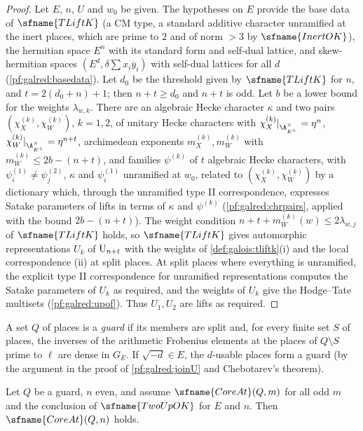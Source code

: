 \begin{proof}
Let $E$, $n$, $U$ and $w_0$ be given. The hypotheses on $E$ provide the base data of $\sfname{TLiftK}$ (a CM type, a standard
additive character unramified at the inert places, which are prime to $2$ and of norm $>3$ by $\sfname{InertOK}$), the
hermitian space $E^n$ with its standard form and self-dual lattice, and skew-hermitian spaces $(E^{d},\delta\sum x_i\bar y_i)$
with self-dual lattices for all $d$ (\cref{pf:galred:basedata}). Let $d_0$ be the threshold given by
$\sfname{TLiftK}$ for $n$, and $t=2(d_0+n)+1$; then $n+t\ge d_0$ and $n+t$ is odd. Let $b$ be a lower bound for the weights
$\lambda_{w,k}$. There are an algebraic Hecke character $\kappa$ and two pairs $(\chi_X^{(k)},\chi_W^{(k)})$, $k=1,2$, of unitary
Hecke characters with $\chi_X^{(k)}|_{\A_{E^+}^\times}=\eta^n$, $\chi_W^{(k)}|_{\A_{E^+}^\times}=\eta^{n+t}$, archimedean exponents
$m_X^{(k)},m_W^{(k)}$ with $m_W^{(k)}\le 2b-(n+t)$, and families $\psi^{(k)}$ of $t$ algebraic Hecke characters, with
$\psi^{(1)}_i\ne\psi^{(2)}_j$, $\kappa$ and $\psi^{(1)}_i$ unramified at $w_0$, related to $(\chi_X^{(k)},\chi_W^{(k)})$ by a
dictionary which, through the unramified type II correspondence, expresses Satake parameters of lifts in terms of $\kappa$
and $\psi^{(k)}$ (\cref{pf:galred:chrpairs}, applied with the bound $2b-(n+t)$).
The weight condition $n+t+m_W^{(k)}(w)\le2\lambda_{w,j}$ of $\sfname{TLiftK}$ holds, so $\sfname{TLiftK}$ gives automorphic
representations $U_k$ of $\mathrm{U}_{n+t}$ with the weights of \cref{def:galois:tliftk}(i) and the local correspondence
(ii) at split places. At split places where everything is unramified, the explicit type II correspondence for unramified
representations computes the Satake parameters of $U_k$ as required, and the weights of $U_k$ give the Hodge--Tate
multisets (\cref{pf:galred:upof}). Thus $U_1,U_2$ are lifts as required.
\end{proof}

A set $Q$ of places is a \emph{guard} if its members are split and, for every finite set $S$ of places, the inverses of the
arithmetic Frobenius elements at the places of $Q\setminus S$ prime to $\ell$ are dense in $G_E$. If $\sqrt{-d}\in E$, the
$d$-usable places form a guard (by the argument in the proof of \cref{pf:galred:joinU} and Chebotarev's theorem).

\begin{lemma}[Subtraction]\label{pf:galred:subtract}
Let $Q$ be a guard, $n$ even, and assume $\sfname{CoreAt}(Q,m)$ for all odd $m$ and the conclusion of $\sfname{TwoUpOK}$ for
$E$ and $n$. Then $\sfname{CoreAt}(Q,n)$ holds.
\end{lemma}

